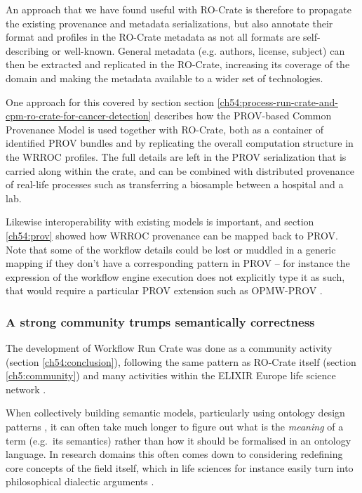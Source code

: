 An approach that we have found useful with RO-Crate is therefore to propagate the existing provenance and metadata serializations, but also annotate their format and profiles in the RO-Crate metadata as not all formats are self-describing or well-known. General metadata (e.g. authors, license, subject) can then be extracted and replicated in the RO-Crate, increasing its coverage of the domain and making the metadata available to a wider set of technologies. 

One approach for this covered by section section \vref{ch54:process-run-crate-and-cpm-ro-crate-for-cancer-detection} describes how the PROV-based Common Provenance Model \cite{Wittner 2023a} is used together with RO-Crate, both as a container of identified PROV bundles and by replicating the overall computation structure in the WRROC profiles.  The full details are left in the PROV serialization that is carried along within the crate, and can be combined with distributed provenance of real-life processes such as transferring a biosample between a hospital and a lab. 

Likewise interoperability with existing models is important, and section \vref{ch54:prov} showed how WRROC provenance can be mapped back to PROV. Note that some of the workflow details could be lost or muddled in a generic mapping if they don't have a corresponding pattern in PROV -- for instance the expression of the workflow engine execution does not explicitly type it as such, that would require a particular PROV extension such as OPMW-PROV \cite{Garijo 2011}. 


\subsubsection{A strong community trumps semantically correctness}

The development of Workflow Run Crate was done as a community activity (section \vref{ch54:conclusion}), following the same pattern as RO-Crate itself (section \vref{ch5:community}) and many activities within the ELIXIR Europe life science network \cite{Harrow 2022}. 

When collectively building semantic models, particularly using ontology design patterns \cite{Hitzler 2016}, it can often take much longer to figure out what is the \emph{meaning} of a term (e.g.~its semantics) rather than how it should be formalised in an ontology language. In research domains this often comes down to considering redefining core concepts of the field itself, which in life sciences for instance easily turn into philosophical dialectic arguments \cite{Falk 2010}. 


